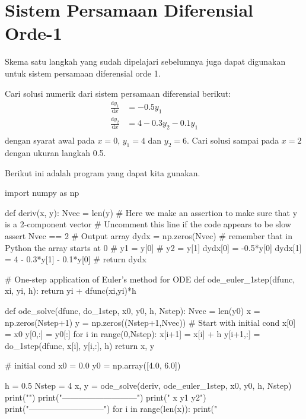 \section{Sistem Persamaan Diferensial Orde-1}

Skema satu langkah yang sudah dipelajari sebelumnya juga dapat digunakan
untuk sistem persamaan diferensial orde 1.

\begin{soal}
Cari solusi numerik dari sistem persamaan diferensial berikut:
\begin{align*}
\frac{\mathrm{d}y_1}{\mathrm{d}x} & = -0.5 y_1 \\
\frac{\mathrm{d}y_2}{\mathrm{d}x} & = 4 - 0.3 y_2 - 0.1y_1 \\
\end{align*}
dengan syarat awal pada $x=0$, $y_1 = 4$ dan $y_2 = 6$.
Cari solusi sampai pada $x=2$ dengan ukuran langkah 0.5.
\end{soal}

Berikut ini adalah program yang dapat kita gunakan.
\begin{pythoncode}
import numpy as np

def deriv(x, y):
    Nvec = len(y)
    # Here we make an assertion to make sure that y is a 2-component vector
    # Uncomment this line if the code appears to be slow
    assert Nvec == 2
    # Output array
    dydx = np.zeros(Nvec)
    # remember that in Python the array starts at 0
    # y1 = y[0]
    # y2 = y[1]
    dydx[0] = -0.5*y[0]
    dydx[1] = 4 - 0.3*y[1] - 0.1*y[0]
    # 
    return dydx
    
# One-step application of Euler's method for ODE
def ode_euler_1step(dfunc, xi, yi, h):
    return yi + dfunc(xi,yi)*h
    
def ode_solve(dfunc, do_1step, x0, y0, h, Nstep):
    Nvec = len(y0)
    x = np.zeros(Nstep+1)
    y = np.zeros((Nstep+1,Nvec))
    # Start with initial cond
    x[0] = x0
    y[0,:] = y0[:]
    for i in range(0,Nstep):
        x[i+1] = x[i] + h
        y[i+1,:] = do_1step(dfunc, x[i], y[i,:], h)
    return x, y
    
# initial cond
x0 = 0.0
y0 = np.array([4.0, 6.0])

h = 0.5
Nstep = 4
x, y = ode_solve(deriv, ode_euler_1step, x0, y0, h, Nstep)
print("")
print("---------------------------")
print(" x         y1         y2")
print("---------------------------")
for i in range(len(x)):
    print("%
\end{pythoncode}

